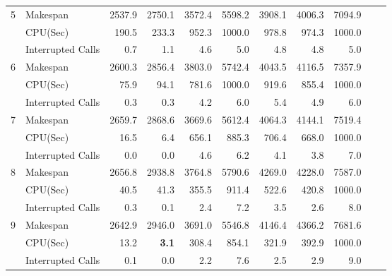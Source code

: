 \documentclass[runningheads]{llncs}
\begin{document}
\begin{table}[t]
\begin{tabular}{l l r r r r r r r r r}
    5                & Makespan             & 2537.9	& 2750.1   & 3572.4	     & 5598.2	   & 3908.1	 & 4006.3  & 7094.9 \\
                     & CPU(Sec)             & 190.5	    & 233.3	   & 952.3	     & 1000.0	   & 978.8	 & 974.3   & 1000.0 \\
                     & Interrupted Calls    & 0.7	    & 1.1      & 4.6	     & 5.0	       & 4.8	 & 4.8     & 5.0 \\[1.5mm]
                     
    6                & Makespan             & 2600.3	& 2856.4   & 3803.0	     & 5742.4	   & 4043.5	 & 4116.5  & 7357.9 \\
                     & CPU(Sec)             & 75.9	    & 94.1	   & 781.6	     & 1000.0	   & 919.6	 & 855.4   & 1000.0 \\
                     & Interrupted Calls    & 0.3	    & 0.3      & 4.2	     & 6.0	       & 5.4	 & 4.9     & 6.0 \\[1.5mm]
                     
    7                & Makespan             & 2659.7	& 2868.6   & 3669.6	     & 5612.4	   & 4064.3	 & 4144.1  & 7519.4 \\
                     & CPU(Sec)             & 16.5	    & 6.4	   & 656.1	     & 885.3	   & 706.4	 & 668.0   & 1000.0 \\
                     & Interrupted Calls    & 0.0	    & 0.0      & 4.6	     & 6.2	       & 4.1	 & 3.8     & 7.0 \\[1.5mm]
                     
    8                & Makespan             & 2656.8	& 2938.8   & 3764.8	     & 5790.6	   & 4269.0	 & 4228.0  & 7587.0 \\
                     & CPU(Sec)             & 40.5	    & 41.3	   & 355.5	     & 911.4	   & 522.6	 & 420.8   & 1000.0 \\
                     & Interrupted Calls    & 0.3	    & 0.1      & 2.4	     & 7.2	       & 3.5	 & 2.6     & 8.0 \\[1.5mm]
                     
    9                & Makespan             & 2642.9	& 2946.0   & 3691.0	     & 5546.8	   & 4146.4	 & 4366.2  & 7681.6 \\
                     & CPU(Sec)             & 13.2	    & \textbf{3.1}	   & 308.4	     & 854.1	   & 321.9	 & 392.9   & 1000.0 \\
                     & Interrupted Calls    & 0.1	    & 0.0      & 2.2	     & 7.6	       & 2.5	 & 2.9     & 9.0 \\[1.5mm]
                     

\end{tabular}
\end{table}
\end{document}
